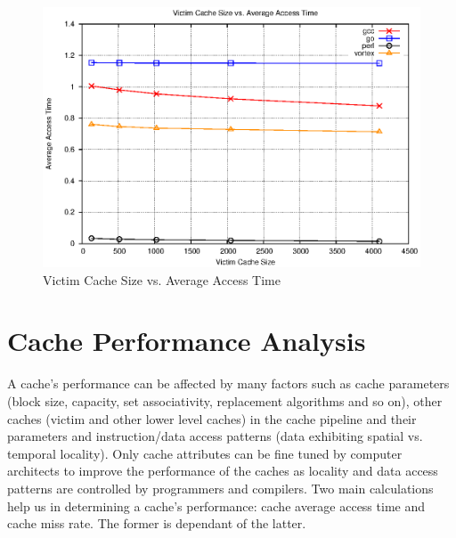\documentclass[a4paper]{article}
\begin{document}
\begin{figure}
    \centering
    \includegraphics[scale=1.32] {vc_aat.eps}
    \captionsetup{justification=centering}
    \caption{Victim Cache Size vs. Average Access Time}
    \label{fig:vcaat_graph}
\end{figure}

\section{Cache Performance Analysis}
A cache's performance can be affected by many factors such as cache parameters (block size, capacity, set associativity, replacement algorithms and so on), other caches (victim and other lower level caches) in the cache pipeline and their parameters and instruction/data access patterns (data exhibiting spatial vs. temporal locality). Only cache attributes can be fine tuned by computer architects to improve the performance of the caches as locality and data access patterns are controlled by programmers and compilers. Two main calculations help us in determining a cache's performance: cache average access time and cache miss rate. The former is dependant of the latter.
\end{document}
